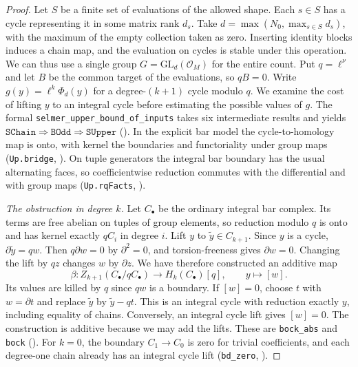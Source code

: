 \begin{proof}
Let $S$ be a finite set of evaluations of the allowed shape.
Each $s\in S$ has a cycle representing it in some matrix rank $d_s$.
Take $d=\max(N_0,\max_{s\in S}d_s)$, with the maximum of the empty
collection taken as zero. Inserting identity blocks induces a chain map,
and the evaluation on cycles is stable under this operation. We can thus
use a single group $G=\mathrm{GL}_d(\mathcal O_M)$ for the entire count.
Put $q=\ell^\nu$ and let $B$ be the common target of the evaluations, so
$qB=0$. Write $g(y)=\ell^k\Phi_d(y)$ for a degree-$(k+1)$ cycle
modulo $q$. We examine the cost of lifting $y$ to an integral cycle
before estimating the possible values of $g$. The formal
\nolinkurl{selmer_upper_bound_of_inputs} takes six intermediate results
and yields $\texttt{SChain}\Rightarrow\texttt{BOdd}\Rightarrow\texttt{SUpper}$
(). In the explicit bar model the cycle-to-homology
map is onto, with kernel the boundaries and functoriality under group
maps (\nolinkurl{Up.bridge}, ).
On tuple generators the integral bar boundary has the usual alternating
faces, so coefficientwise reduction commutes with the differential and
with group maps (\nolinkurl{Up.rqFacts}, ).

\smallskip\noindent\emph{The obstruction in degree $k$.}
Let $C_\bullet$ be the ordinary integral bar complex. Its terms are
free abelian on tuples of group elements, so reduction modulo $q$
is onto and has kernel exactly $qC_i$ in degree $i$. Lift $y$ to
$\widetilde y\in C_{k+1}$. Since $y$ is a cycle,
$\partial\widetilde y=q w$. Then $q\partial w=0$ by $\partial^2=0$,
and torsion-freeness gives $\partial w=0$. Changing the lift by $q z$
changes $w$ by $\partial z$. We have therefore constructed an additive map
\[
 \beta:Z_{k+1}(C_\bullet/qC_\bullet)\longrightarrow H_k(C_\bullet)[q],
              \qquad y\longmapsto[w] .
\]
Its values are killed by $q$ since $q w$ is a boundary. If $[w]=0$,
choose $t$ with $w=\partial t$ and replace $\widetilde y$ by
$\widetilde y-q t$. This is an integral cycle with reduction exactly
$y$, including equality of chains. Conversely, an integral cycle lift
gives $[w]=0$. The construction is additive because we may add the lifts.
These are \nolinkurl{bock_abs} and \nolinkurl{bock}
().
For $k=0$, the boundary $C_1\to C_0$ is zero for trivial coefficients,
and each degree-one chain already has an integral cycle lift
(\nolinkurl{bd_zero}, ).


\end{proof}
